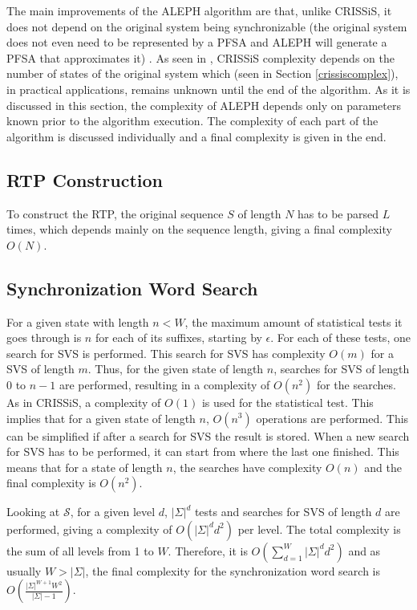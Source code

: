 {The main improvements of the ALEPH algorithm are that, unlike CRISSiS, it does not depend on the original system being synchronizable (the original system does not even need to be represented by a PFSA and ALEPH will generate a PFSA that approximates it) . As seen in \citep{asok.11}, CRISSiS complexity depends on the number of states of the original system which (seen in Section \ref{crissiscomplex}), in practical applications, remains unknown until the end of the algorithm. As it is discussed in this section, the complexity of ALEPH depends only on parameters known prior to the algorithm execution. The complexity of each part of the algorithm is discussed individually and a final complexity is given in the end.

\subsection{RTP Construction}

To construct the RTP, the original sequence $S$ of length $N$ has to be parsed $L$ times, which depends mainly on the sequence length, giving a final complexity $O(N)$.

\subsection{Synchronization Word Search}

For a given state with length $n < W$, the maximum amount of statistical tests it goes through is $n$ for each of its suffixes, starting by $\epsilon$. For each of these tests, one search for SVS is performed. This search for SVS has complexity $O(m)$ for a SVS of length $m$. Thus, for the given state of length $n$, searches for SVS of length 0 to $n-1$ are performed, resulting in a complexity of $O(n^2)$ for the searches. As in CRISSiS, a complexity of $O(1)$ is used for the statistical test. This implies that for a given state of length $n$, $O(n^3)$ operations are performed. This can be simplified if after a search for SVS the result is stored. When a new search for SVS has to be performed, it can start from where the last one finished. This means that for a state of length $n$, the searches have complexity $O(n)$ and the final complexity is $O(n^2)$.

Looking at $\mathcal{S}$, for a given level $d$, $|\Sigma|^d$ tests and searches for SVS of length $d$ are performed, giving a complexity of $O(|\Sigma|^dd^2)$ per level. The total complexity is the sum of all levels from 1 to $W$. Therefore, it is $O(\sum\limits_{d=1}^{W}|\Sigma|^dd^2)$ and as usually $W > |\Sigma|$, the final complexity for the synchronization word search is $O(\frac{|\Sigma|^{W+1}W^2}{|\Sigma|-1})$. 

}
